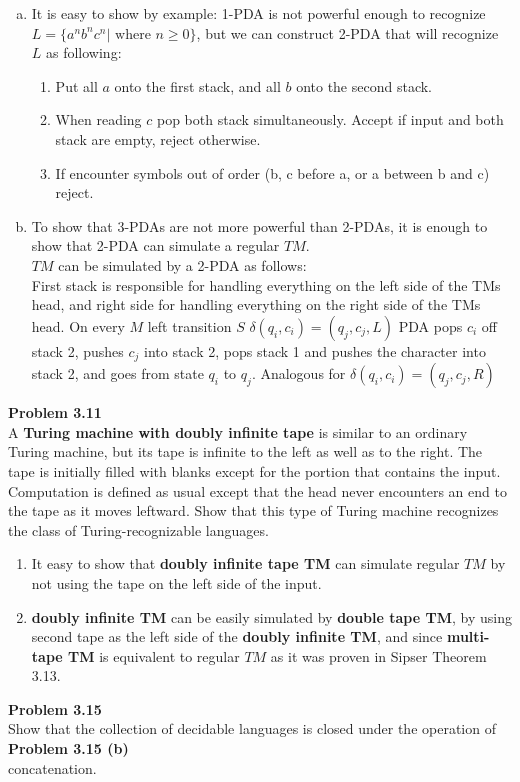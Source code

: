 \documentclass{article}
\newcommand\curl[1]{\{#1\}}
\newcommand{\problem}[1]{\large{\textbf{Problem #1}}\\}
\begin{document}
\begin{enumerate}[a., leftmargin = 1.5cm]
\itemsep0em
\item It is easy to show by example: 1-PDA is not powerful enough to recognize $L = \curl{a^n b^n c^n |
\text{ where } n \geq 0}$, but we can construct 2-PDA that will recognize $L$ as following:
\begin{enumerate}[1., leftmargin = 1.5cm]
\itemsep0em
\item Put all $a$ onto the first stack, and all $b$ onto the second stack.
\item When reading $c$ pop both stack simultaneously. Accept if input and both stack are empty, reject otherwise.
\item If encounter symbols out of order (b, c before a, or a between b and c) reject.
\end{enumerate}
\item To show that 3-PDAs are not more powerful than 2-PDAs, it is enough to show that
2-PDA can simulate a regular $TM$. \\
$TM$ can be simulated by a 2-PDA as follows:\\
First stack is responsible for handling everything on the left side of the TMs head, and right side
for handling everything on the right side of the TMs head. On every $M$ left transition $S$
$\delta(q_i,c_i) = (q_j,c_j,L)$ PDA pops $c_i$ off stack 2, pushes $c_j$ into stack 2, pops stack 1 and 
pushes the character into stack 2, and goes from state $q_i$ to $q_j$. Analogous for $\delta(q_i,c_i) = (q_j,c_j,R)$


\end{enumerate}
\problem{3.11}
A \textbf{Turing machine with doubly infinite tape} is similar to an ordinary
Turing machine, but its tape is infinite to the left as well as to the right. The tape
is initially filled with blanks except for the portion that contains the input. Computation is
defined as usual except that the head never encounters an end to the tape as it
moves leftward. Show that this type of Turing machine recognizes the class of Turing-recognizable 
languages. \\


\begin{enumerate}[1., leftmargin = 1.5cm]
\itemsep0em
\item It easy to show that \textbf{doubly infinite tape TM} can simulate regular $TM$ by not using the 
tape on the left side of the input.
\item \textbf{doubly infinite TM} can be easily simulated by \textbf{double tape TM}, by using second tape
as the left side of the \textbf{doubly infinite TM}, and since \textbf{ multi-tape TM} is equivalent to
regular $TM$ as it was proven in Sipser Theorem 3.13. \\
\end{enumerate}
\problem{3.15}
Show that the collection of decidable languages is closed under the operation of\\
\problem{3.15  (b)}
concatenation.\\
\end{document}
